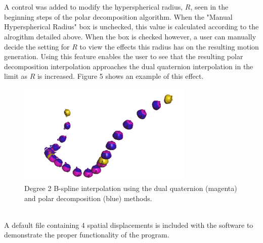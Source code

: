 \documentclass[11pt]{article}
\begin{document}
\\
\\
A control was added to modify the hyperspherical radius, $R$, seen in the beginning steps of the polar decomposition algorithm. When the "Manual Hyperspherical Radius" box is unchecked, this value is calculated according to the alrogithm detailed above. When the box is checked however, a user can manually decide the setting for $R$ to view the effects this radius has on the resulting motion generation. Using this feature enables the user to see that the resulting polar decomposition interpolation approaches the dual quaternion interpolation in the limit as $R$ is increased. Figure 5 shows an example of this effect.
\\
\begin{figure}[h]
  \centering
  \includegraphics[width=0.75\textwidth]{Compare.png}
  \caption{Degree 2 B-spline interpolation using the dual quaternion (magenta) and polar decomposition (blue) methods. }
  \label{Figure: 5}
\end{figure}
\\
A default file containing 4 spatial displacements is included with the software to demonstrate the proper functionality of the program.

\newpage
\end{document}
